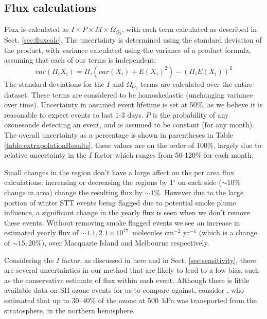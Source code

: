 \documentclass[acp, manuscript]{copernicus} %
\begin{document}
  \subsection{Flux calculations}
    \label{sec:fluxuncertainty}
    Flux is calculated as $ I \times P \times M \times \Omega_{O_3}$, with each term calculated as described in Sect. \ref{sec:fluxcalc}.
    The uncertainty is determined using the standard deviation of the product, with variance calculated using the variance of a product formula, assuming that each of our terms is independent: 
    \begin{equation*} var(\Pi_i X_i) = \Pi_i ( var(X_i) + E(X_i)^2 ) - (\Pi_i E(X_i))^2 \end{equation*}
    The standard deviations for the $I$ and $\Omega_{O_3}$ terms are calculated over the entire dataset.
    These terms are considered to be homoskedastic (unchanging variance over time).
    Uncertainty in assumed event lifetime is set at 50\%, as we believe it is reasonable to expect events to last 1-3 days.
    $P$ is the probability of any ozonesonde detecting an event, and is assumed to be constant (for any month).
    The overall uncertainty as a percentage is shown in parentheses in Table \ref{table:extrapolationResults}, these values are on the order of 100\%, largely due to relative uncertainty in the $I$ factor which ranges from 50-120\% for each month.

    Small changes in the region don't have a large affect on the per area flux calculations: increasing or decreasing the regions by 1$^{\circ}$ on each side ($\sim 10\%$ change in area) change the resulting flux by $\sim 1\%$. %
    However due to the large portion of winter STT events being flagged due to potential smoke plume influence, a significant change in the yearly flux is seen when we don't remove these events.
    Without removing smoke flagged events we see an increase in estimated yearly flux of $\sim 1.1, 2.1 \times 10^{17} $~molecules cm$^{-2}$ yr$^{-1}$ (which is a change of $\sim 15, 20\%$), over Macquarie Island and Melbourne respectively.

    Considering the $I$ factor, as discussed in here and in Sect. \ref{sec:sensitivity}, there are several uncertainties in our method that are likely to lead to a low bias, such as the conservative estimate of flux within each event.
    Although there is little available data on SH ozone events for us to compare against, consider \citet{Terao2008}, who estimated that up to 30--40\% of the ozone at 500~hPa was transported from the stratosphere, in the northern hemisphere.
\end{document}
